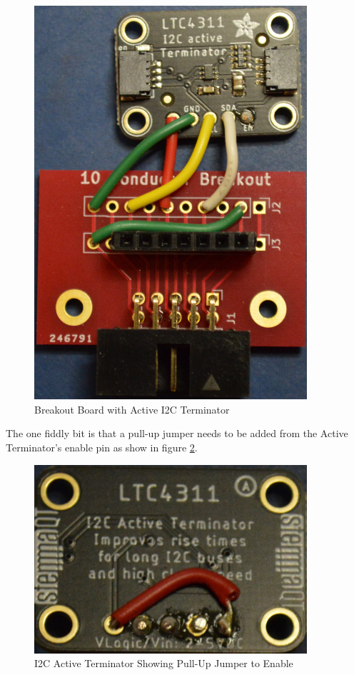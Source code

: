 \documentclass[10pt, openany]{book}
\begin{document}
\begin{figure}[ht!]
  \centering
  \includegraphics[width=0.9\textwidth]{../Pict/Breakout-Driver.jpg}
  \caption{Breakout Board with Active I2C Terminator}
  \label{fig:BreakoutDriver}
\end{figure}

The one fiddly bit is that a pull-up jumper needs to be added from the Active Terminator's enable pin as show in figure \ref{fig:DriverJumper}.

\begin{figure}[ht!]
  \centering
  \includegraphics[width=0.9\textwidth]{../Pict/Driver-Jumper.jpg}
  \caption{I2C Active Terminator Showing Pull-Up Jumper to Enable}
  \label{fig:DriverJumper}
\end{figure}
\end{document}
